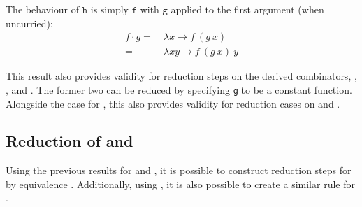 The behaviour of $\texttt{h}$ is simply $\texttt{f}$ with $\texttt{g}$ applied to the first argument (when uncurried);
\begin{align*}
    f \cdot g =\ & \lambda x \to f\ (g\ x) \\
    =\ & \lambda xy \to f\ (g\ x)\ y
\end{align*}

This result also provides validity for reduction steps on the derived combinators, \texttt{\constfmapl}, \texttt{\constfmapr}, and \texttt{\pamf}.
The former two can be reduced by specifying \texttt{g} to be a constant function.
Alongside the case for \texttt{\mult}, this also provides validity for reduction cases on \texttt{\ap} and \texttt{\pa}.

\subsection{Reduction of \texttt{\ap} and \texttt{\pa}}
Using the previous results for \texttt{\mult} and \texttt{\fmap}, it is possible to construct reduction steps for \texttt{\ap} by equivalence \equi[14].
Additionally, using \equi[1], it is also possible to create a similar rule for \texttt{\pa}.

